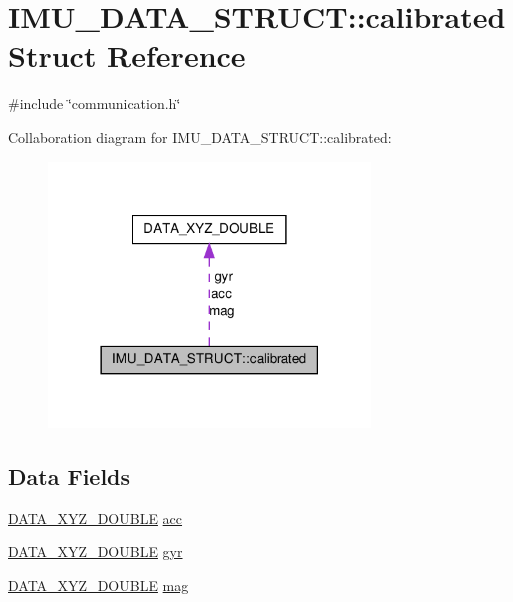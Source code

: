 \hypertarget{structIMU__DATA__STRUCT_1_1calibrated}{\section{I\-M\-U\-\_\-\-D\-A\-T\-A\-\_\-\-S\-T\-R\-U\-C\-T\-:\-:calibrated Struct Reference}
\label{structIMU__DATA__STRUCT_1_1calibrated}
}


{\ttfamily \#include \char`\"{}communication.\-h\char`\"{}}



Collaboration diagram for I\-M\-U\-\_\-\-D\-A\-T\-A\-\_\-\-S\-T\-R\-U\-C\-T\-:\-:calibrated\-:\nopagebreak
\begin{figure}[H]
\begin{center}
\leavevmode
\includegraphics[width=242pt]{structIMU__DATA__STRUCT_1_1calibrated__coll__graph}
\end{center}
\end{figure}
\subsection*{Data Fields}
\begin{DoxyCompactItemize}
\item 
\hyperlink{structDATA__XYZ__DOUBLE}{D\-A\-T\-A\-\_\-\-X\-Y\-Z\-\_\-\-D\-O\-U\-B\-L\-E} \hyperlink{structIMU__DATA__STRUCT_1_1calibrated_a281a7fdb40a05ed97388f18b9bb90c81}{acc}
\item 
\hyperlink{structDATA__XYZ__DOUBLE}{D\-A\-T\-A\-\_\-\-X\-Y\-Z\-\_\-\-D\-O\-U\-B\-L\-E} \hyperlink{structIMU__DATA__STRUCT_1_1calibrated_a8a54aded6ce608f1b7d2b4a0c52c248b}{gyr}
\item 
\hyperlink{structDATA__XYZ__DOUBLE}{D\-A\-T\-A\-\_\-\-X\-Y\-Z\-\_\-\-D\-O\-U\-B\-L\-E} \hyperlink{structIMU__DATA__STRUCT_1_1calibrated_a2fde6c6759e0fda17e272c32096cb9ec}{mag}
\end{DoxyCompactItemize}


